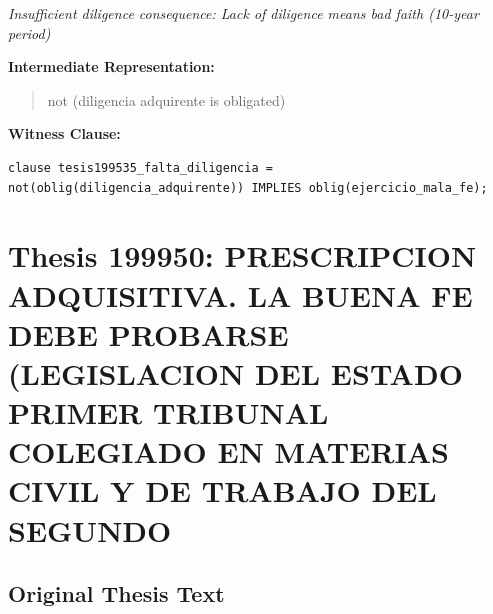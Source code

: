 \documentclass[11pt,a4paper]{article}
\begin{document}
\textit{Insufficient diligence consequence: Lack of diligence means bad faith (10-year period)}

\textbf{Intermediate Representation:}

\begin{quote}
not (diligencia adquirente is obligated)
\end{quote}

\textbf{Witness Clause:}

\begin{lstlisting}[style=witnessstyle, language=Witness]
clause tesis199535_falta_diligencia = not(oblig(diligencia_adquirente)) IMPLIES oblig(ejercicio_mala_fe);
\end{lstlisting}

\newpage

\section{Thesis 199950: PRESCRIPCION ADQUISITIVA. LA BUENA FE DEBE PROBARSE (LEGISLACION DEL ESTADO PRIMER TRIBUNAL COLEGIADO EN MATERIAS CIVIL Y DE TRABAJO DEL SEGUNDO}
\label{thesis:199950}

\subsection{Original Thesis Text}
\end{document}
